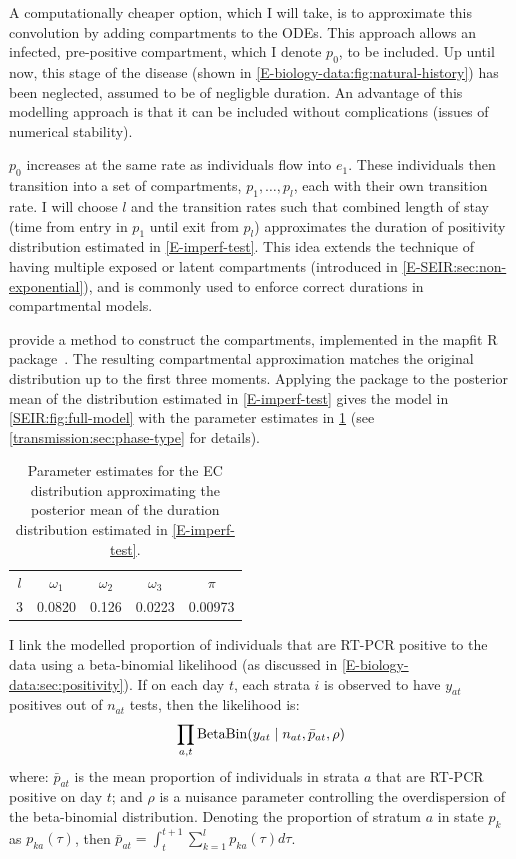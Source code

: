 \documentclass[thesis.tex]{subfiles}
\begin{document}
A computationally cheaper option, which I will take, is to approximate this convolution by adding compartments to the ODEs.
This approach allows an infected, pre-positive compartment, which I denote $p_0$, to be included.
Up until now, this stage of the disease (shown in \cref{E-biology-data:fig:natural-history}) has been neglected, assumed to be of negligble duration.
An advantage of this modelling approach is that it can be included without complications (\eg issues of numerical stability).

$p_0$ increases at the same rate as individuals flow into $e_1$.
These individuals then transition into a set of compartments, $p_1, \dots, p_l$, each with their own transition rate.
I will choose $l$ and the transition rates such that combined length of stay (\ie time from entry in $p_1$ until exit from $p_l$) approximates the duration of positivity distribution estimated in \cref{E-imperf-test}.
This idea extends the technique of having multiple exposed or latent compartments (introduced in \cref{E-SEIR:sec:non-exponential}), and is commonly used to enforce correct durations in compartmental models.

\Textcite{osogamiClosed} provide a method to construct the compartments, implemented in the mapfit R package~\autocite{mapfit}. 
The resulting compartmental approximation matches the original distribution up to the first three moments.
Applying the package to the posterior mean of the distribution estimated in \cref{E-imperf-test} gives the model in \cref{SEIR:fig:full-model} with the parameter estimates in \cref{SEIR:table:ec-params} (see \cref{transmission:sec:phase-type} for details).
\begin{table}
    \centering
    \begin{tabular}{c c c c c}
        $l$ & $\omega_1$ & $\omega_{2}$ & $\omega_{3}$ & $\pi$ \\
        3 & 0.0820 & 0.126 & 0.0223 & 0.00973  \\
    \end{tabular}
    \caption{Parameter estimates for the EC distribution approximating the posterior mean of the duration distribution estimated in \cref{E-imperf-test}.}
    \label{SEIR:table:ec-params}
\end{table}

I link the modelled proportion of individuals that are RT-PCR positive to the data using a beta-binomial likelihood (as discussed in \cref{E-biology-data:sec:positivity}).
If on each day $t$, each strata $i$ is observed to have $y_{at}$ positives out of $n_{at}$ tests, then the likelihood is:
\begin{align}
    \prod_{a,t} \operatorname{BetaBin} (y_{at} \mid n_{at}, \bar{p}_{at}, \rho)
    \label{SEIR:eq:likelihood}
\end{align}
where: $\bar{p}_{at}$ is the mean proportion of individuals in strata $a$ that are RT-PCR positive on day $t$; and $\rho$ is a nuisance parameter controlling the overdispersion of the beta-binomial distribution.
Denoting the proportion of stratum $a$ in state $p_k$ as $p_{ka}(\tau)$, then $\bar{p}_{at} = \int_{t}^{t+1} \sum_{k=1}^l p_{ka}(\tau) d\tau$.
\end{document}
